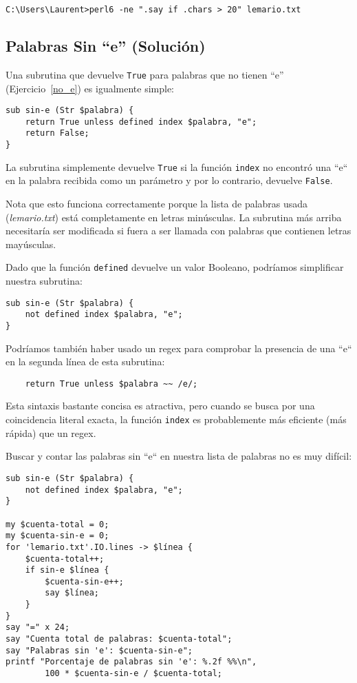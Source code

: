 \begin{verbatim}
C:\Users\Laurent>perl6 -ne ".say if .chars > 20" lemario.txt
\end{verbatim} 
%

\subsection{Palabras Sin ``e'' (Solución)}

Una subrutina que devuelve {\tt True} para palabras que no tienen ``e''
(Ejercicio~\ref{no_e}) es igualmente simple:

\begin{verbatim}
sub sin-e (Str $palabra) {
    return True unless defined index $palabra, "e";
    return False;
}
\end{verbatim}
%

La subrutina simplemente devuelve {\tt True} si la función {\tt index} 
no encontró una ``e`` en la palabra recibida como un parámetro y
por lo contrario, devuelve {\tt False}.

Nota que esto funciona correctamente porque la lista de palabras usada
(\emph{lemario.txt}) está completamente en letras minúsculas. La subrutina
más arriba necesitaría ser modificada si fuera a ser llamada con palabras
que contienen letras mayúsculas.

Dado que la función {\tt defined} devuelve un valor Booleano, podríamos 
simplificar nuestra subrutina:
\begin{verbatim}
sub sin-e (Str $palabra) {
    not defined index $palabra, "e";
}
\end{verbatim}
%

Podríamos también haber usado un regex para comprobar la 
presencia de una ``e`` en la segunda línea de esta subrutina:

\begin{verbatim}
    return True unless $palabra ~~ /e/;
\end{verbatim}
%

Esta sintaxis bastante concisa es atractiva, pero cuando se
busca por una coincidencia literal exacta, la función {\tt index}
es probablemente más eficiente (más rápida) que un regex.

Buscar y contar las palabras sin ``e`` en nuestra lista de palabras 
no es muy difícil:

\begin{verbatim}
sub sin-e (Str $palabra) {
    not defined index $palabra, "e";
}

my $cuenta-total = 0;
my $cuenta-sin-e = 0;
for 'lemario.txt'.IO.lines -> $línea { 
    $cuenta-total++;
    if sin-e $línea {
        $cuenta-sin-e++;
        say $línea;
    }
}
say "=" x 24;
say "Cuenta total de palabras: $cuenta-total";
say "Palabras sin 'e': $cuenta-sin-e";
printf "Porcentaje de palabras sin 'e': %.2f %%\n", 
        100 * $cuenta-sin-e / $cuenta-total;
\end{verbatim}

